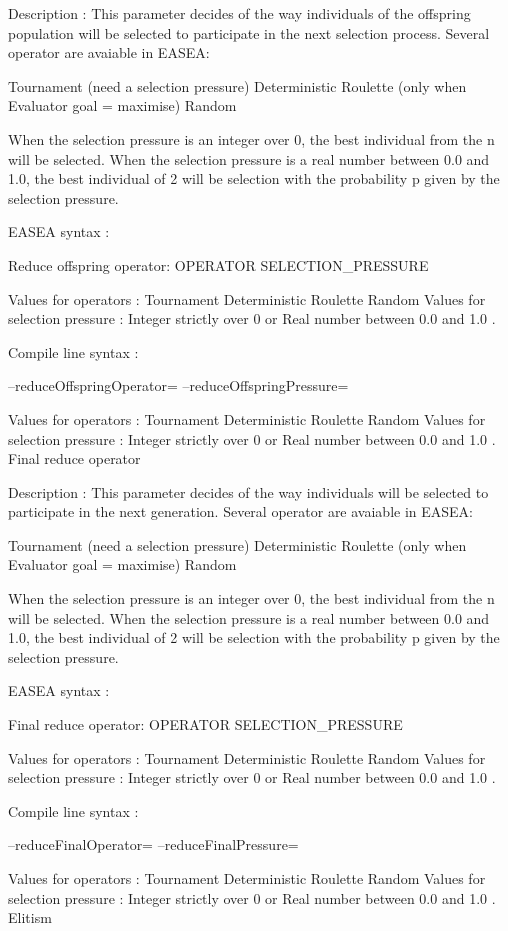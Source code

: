 \documentclass{article}
\begin{document}
Description :
This parameter decides of the way individuals of the offspring population will be selected to participate in the next selection process. Several operator are avaiable in EASEA:

    Tournament (need a selection pressure)
    Deterministic
    Roulette (only when Evaluator goal = maximise)
    Random 

When the selection pressure is an integer over 0, the best individual from the n will be selected.
When the selection pressure is a real number between 0.0 and 1.0, the best individual of 2 will be selection with the probability p given by the selection pressure.

EASEA syntax :

Reduce offspring operator: OPERATOR SELECTION_PRESSURE

Values for operators : Tournament Deterministic Roulette Random
Values for selection pressure : Integer strictly over 0 or Real number between 0.0 and 1.0 .

Compile line syntax :

--reduceOffspringOperator=
--reduceOffspringPressure=

Values for operators : Tournament Deterministic Roulette Random
Values for selection pressure : Integer strictly over 0 or Real number between 0.0 and 1.0 .
Final reduce operator

Description :
This parameter decides of the way individuals will be selected to participate in the next generation. Several operator are avaiable in EASEA:

    Tournament (need a selection pressure)
    Deterministic
    Roulette (only when Evaluator goal = maximise)
    Random 

When the selection pressure is an integer over 0, the best individual from the n will be selected.
When the selection pressure is a real number between 0.0 and 1.0, the best individual of 2 will be selection with the probability p given by the selection pressure.

EASEA syntax :

Final reduce operator: OPERATOR SELECTION_PRESSURE

Values for operators : Tournament Deterministic Roulette Random
Values for selection pressure : Integer strictly over 0 or Real number between 0.0 and 1.0 .

Compile line syntax :

--reduceFinalOperator=
--reduceFinalPressure=

Values for operators : Tournament Deterministic Roulette Random
Values for selection pressure : Integer strictly over 0 or Real number between 0.0 and 1.0 .
Elitism
\end{document}
